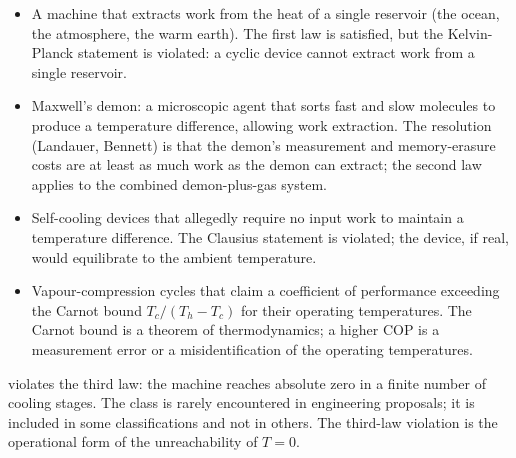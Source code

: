 \begin{itemize}[leftmargin=*]
  \item A machine that extracts work from the heat of a single
    reservoir (the ocean, the atmosphere, the warm earth). The first
    law is satisfied, but the Kelvin-Planck statement is violated: a
    cyclic device cannot extract work from a single reservoir.
  \item Maxwell's demon: a microscopic agent that sorts fast and slow
    molecules to produce a temperature difference, allowing work
    extraction. The resolution (Landauer, Bennett) is that the
    demon's measurement and memory-erasure costs are at least as much
    work as the demon can extract; the second law applies to the
    combined demon-plus-gas system.
  \item Self-cooling devices that allegedly require no input work to
    maintain a temperature difference. The Clausius statement is
    violated; the device, if real, would equilibrate to the ambient
    temperature.
  \item Vapour-compression cycles that claim a coefficient of
    performance exceeding the Carnot bound $T_c/(T_h - T_c)$ for
    their operating temperatures. The Carnot bound is a theorem of
    thermodynamics; a higher COP is a measurement error or a
    misidentification of the operating temperatures.
\end{itemize}

 violates the third law:
the machine reaches absolute zero in a finite number of cooling
stages. The class is rarely encountered in engineering proposals; it
is included in some classifications and not in others. The third-law
violation is the operational form of the unreachability of $T = 0$.

